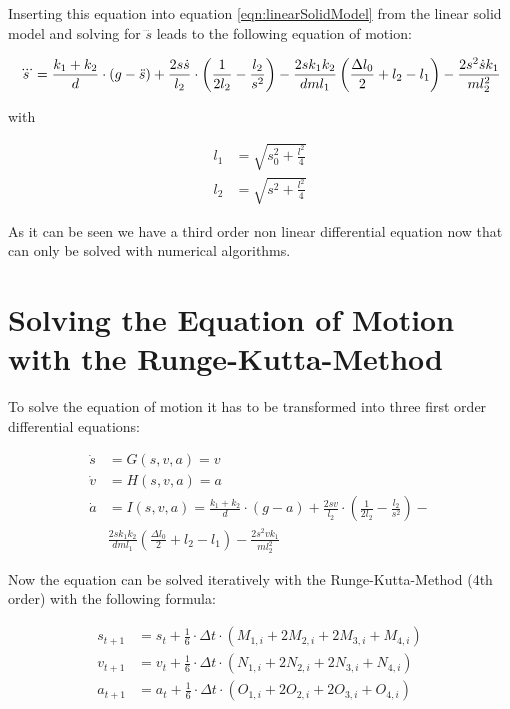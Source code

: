 Inserting this equation into equation \ref{eqn:linearSolidModel} from the linear solid model and solving for $\dddot s$ leads to the following equation of motion:

\begin{equation}
\begin{split}
	\dddot s = \frac{k_1 + k_2}{d} \cdot (g - \ddot s) + \frac{2s\dot s}{l_2}\cdot \left(\frac{1}{2 l_2} - \frac{l_2}{s^2} \right) - \frac{2sk_1k_2}{dml_1} \left(\frac{\Delta l_0}{2} + l_2 - l_1\right) - \frac{2s^2\dot s k_1}{ml_2^2}	
\end{split}
\label{eqn:equationOfEmotion}
\end{equation}

with

\begin{align}
	l_1 &= \sqrt{s_0^2 + \frac{l^2}{4}} \\
	l_2 &= \sqrt{s^2 + \frac{l^2}{4}}
\end{align}

As it can be seen we have a third order non linear differential equation now that can only be solved with numerical algorithms.

\section{Solving the Equation of Motion with the Runge-Kutta-Method }

To solve the equation of motion it has to be transformed into three first order differential equations:

\begin{align}
	\dot s &=G(s,v,a) = v \\
	\dot v &= H(s,v,a) = a \\
	\dot a &= I(s,v,a) = \frac{k_1 + k_2}{d} \cdot (g - a) + \frac{2sv}{l_2}\cdot \left(\frac{1}{2 l_2} - \frac{l_2}{s^2} \right) - \\ &\frac{2sk_1k_2}{dml_1} \left(\frac{\Delta l_0}{2} + l_2 - l_1\right) - \frac{2s^2v k_1}{ml_2^2}	
\end{align}

Now the equation can be solved iteratively with the Runge-Kutta-Method (4th order) with the following formula:

\begin{align}
	s_{t+1} &= s_t + \frac{1}{6} \cdot \Delta t \cdot (M_{1,i} + 2 M_{2,i} +2M_{3,i} +M_{4,i} ) \\ v_{t+1} &= v_t + \frac{1}{6} \cdot \Delta t \cdot (N_{1,i} + 2 N_{2,i} +2N_{3,i} +N_{4,i} ) \\
	a_{t+1} &= a_t + \frac{1}{6} \cdot \Delta t \cdot (O_{1,i} + 2 O_{2,i} +2O_{3,i} +O_{4,i} ) \\
\end{align}

